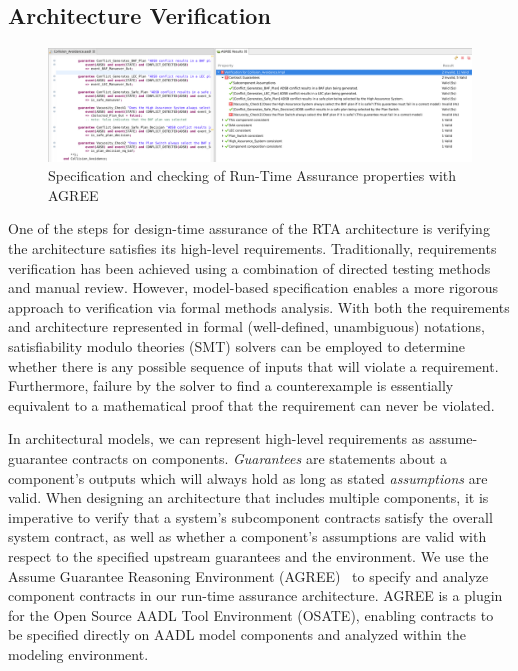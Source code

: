 \subsection{Architecture Verification}

\begin{figure}
	\centering
	\includegraphics[width=\textwidth]{figures/rta-agree-v2.jpg}
	\caption{Specification and checking of Run-Time Assurance properties with AGREE}
	\label{fig:rta-agree}
\end{figure}

One of the steps for design-time assurance of the RTA architecture is verifying the architecture satisfies its high-level requirements.  Traditionally, requirements verification has been achieved using a combination of directed testing methods and manual review. However, model-based specification enables a more rigorous approach to verification via formal methods analysis. With both the requirements and architecture represented in formal (well-defined, unambiguous) notations, satisfiability modulo theories (SMT) solvers can be employed to determine whether there is any possible sequence of inputs that will violate a requirement.  Furthermore, failure by the solver to find a counterexample is essentially equivalent to a mathematical proof that the requirement can never be violated.  

In architectural models, we can represent high-level requirements as assume-guarantee contracts on components.  \textit{Guarantees} are statements about a component's outputs which will always hold as long as stated \textit{assumptions} are valid.  When designing an architecture that includes multiple components, it is imperative to verify that a system's subcomponent contracts satisfy the overall system contract, as well as whether a component's assumptions are valid with respect to the specified upstream guarantees and the environment.
%
We use the Assume Guarantee Reasoning Environment (AGREE)~\cite{agree2012} to specify and analyze component contracts in our run-time assurance architecture.  AGREE is a plugin for the Open Source AADL Tool Environment (OSATE), enabling contracts to be specified directly on AADL model components and analyzed within the modeling environment.

